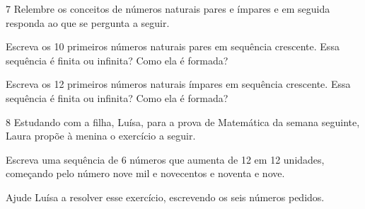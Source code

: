 \begin{mdframed}[linewidth=2pt,linecolor=salmao,roundcorner=2pt]

\end{mdframed}

\num{7} Relembre os conceitos de números naturais pares e ímpares e em seguida
responda ao que se pergunta a seguir.

\begin{escolha}
\item
  Escreva os 10 primeiros números naturais pares em sequência crescente.
  Essa sequência é finita ou infinita? Como ela é formada?


\item
  Escreva os 12 primeiros números naturais ímpares em sequência
  crescente. Essa sequência é finita ou infinita? Como ela é formada?

\end{escolha}


\num{8} Estudando com a filha, Luísa, para a prova de Matemática da semana seguinte,
Laura propõe à menina o exercício a seguir.

Escreva uma sequência de 6 números que aumenta de 12 em 12 unidades,
começando pelo número nove mil e novecentos e noventa e nove.

Ajude Luísa a resolver esse exercício, escrevendo os seis números
pedidos.

\begin{mdframed}[linewidth=2pt,linecolor=salmao,roundcorner=2pt]
\vspace{1cm}
\end{mdframed}

